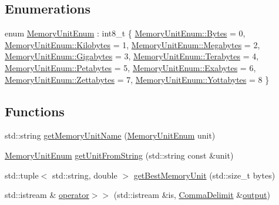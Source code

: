\subsection*{Enumerations}
\begin{DoxyCompactItemize}
\item 
enum \hyperlink{namespacevt_1_1util_1_1memory_a64df3d84293b34009f78e2a1db2f9bb6}{Memory\+Unit\+Enum} \+: int8\+\_\+t \{ \newline
\hyperlink{namespacevt_1_1util_1_1memory_a64df3d84293b34009f78e2a1db2f9bb6a600e754f49b68aa0fc90a9cd64eb7051}{Memory\+Unit\+Enum\+::\+Bytes} = 0, 
\hyperlink{namespacevt_1_1util_1_1memory_a64df3d84293b34009f78e2a1db2f9bb6aa3a6c675a174320497f3bed7e8dc3329}{Memory\+Unit\+Enum\+::\+Kilobytes} = 1, 
\hyperlink{namespacevt_1_1util_1_1memory_a64df3d84293b34009f78e2a1db2f9bb6a2276a1b157f2813f3b65d04c0b1c56f6}{Memory\+Unit\+Enum\+::\+Megabytes} = 2, 
\hyperlink{namespacevt_1_1util_1_1memory_a64df3d84293b34009f78e2a1db2f9bb6af6f7ad0fd5914138fb449b9011c8de7a}{Memory\+Unit\+Enum\+::\+Gigabytes} = 3, 
\newline
\hyperlink{namespacevt_1_1util_1_1memory_a64df3d84293b34009f78e2a1db2f9bb6a9a2365433d590975874f09f0d5b5216d}{Memory\+Unit\+Enum\+::\+Terabytes} = 4, 
\hyperlink{namespacevt_1_1util_1_1memory_a64df3d84293b34009f78e2a1db2f9bb6a05a340fbd2fb19c6bf2a92a854b8db6f}{Memory\+Unit\+Enum\+::\+Petabytes} = 5, 
\hyperlink{namespacevt_1_1util_1_1memory_a64df3d84293b34009f78e2a1db2f9bb6a1e7535056f489fc82f76fae19149b2ef}{Memory\+Unit\+Enum\+::\+Exabytes} = 6, 
\hyperlink{namespacevt_1_1util_1_1memory_a64df3d84293b34009f78e2a1db2f9bb6ae7d195686624d72a3737ed4d84058f41}{Memory\+Unit\+Enum\+::\+Zettabytes} = 7, 
\newline
\hyperlink{namespacevt_1_1util_1_1memory_a64df3d84293b34009f78e2a1db2f9bb6a2be006d4ea302bcbb425e28e3b0c2e7b}{Memory\+Unit\+Enum\+::\+Yottabytes} = 8
 \}
\end{DoxyCompactItemize}
\subsection*{Functions}
\begin{DoxyCompactItemize}
\item 
std\+::string \hyperlink{namespacevt_1_1util_1_1memory_a6a1de4e8806e74e6e0ef92e4262b654b}{get\+Memory\+Unit\+Name} (\hyperlink{namespacevt_1_1util_1_1memory_a64df3d84293b34009f78e2a1db2f9bb6}{Memory\+Unit\+Enum} unit)
\item 
\hyperlink{namespacevt_1_1util_1_1memory_a64df3d84293b34009f78e2a1db2f9bb6}{Memory\+Unit\+Enum} \hyperlink{namespacevt_1_1util_1_1memory_aeceb7d7ac924dd3d88a58eab5ebf64f7}{get\+Unit\+From\+String} (std\+::string const \&unit)
\item 
std\+::tuple$<$ std\+::string, double $>$ \hyperlink{namespacevt_1_1util_1_1memory_ac3c8e7e8b253b5d9a4b4c7c662f22305}{get\+Best\+Memory\+Unit} (std\+::size\+\_\+t bytes)
\item 
std\+::istream \& \hyperlink{namespacevt_1_1util_1_1memory_afe1acbbca9aa1bd7310548cefd40045c}{operator$>$$>$} (std\+::istream \&is, \hyperlink{structvt_1_1util_1_1memory_1_1_comma_delimit}{Comma\+Delimit} \&\hyperlink{namespacevt_a3435f69ba053685a43d1d49317d635de}{output})
\end{DoxyCompactItemize}
